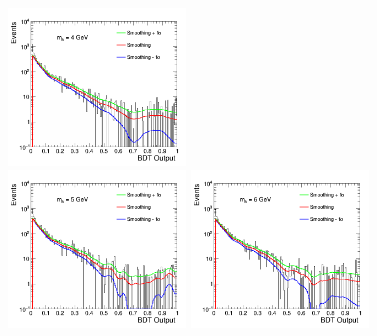 \begin{figure}[htbp]
\begin{center}
		\includegraphics[width=0.42\textwidth]{figures/chapter04/bkg_smooth/M4_all_DYJetsToLL_SR.png}\\
		\includegraphics[width=0.42\textwidth]{figures/chapter04/bkg_smooth/M5_all_DYJetsToLL_SR.png}
		\includegraphics[width=0.42\textwidth]{figures/chapter04/bkg_smooth/M6_all_DYJetsToLL_SR.png}\\
    \label{fig:bkg_smooth1}
\end{center}
\end{figure}

